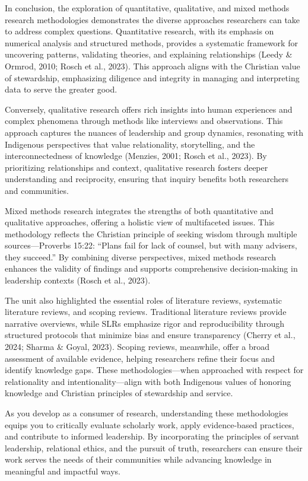 \documentclass[
  letterpaper,
  DIV=11,
  numbers=noendperiod]{scrreprt}
\begin{document}

In conclusion, the exploration of quantitative, qualitative, and mixed
methods research methodologies demonstrates the diverse approaches
researchers can take to address complex questions. Quantitative
research, with its emphasis on numerical analysis and structured
methods, provides a systematic framework for uncovering patterns,
validating theories, and explaining relationships (Leedy \& Ormrod,
2010; Rosch et al., 2023). This approach aligns with the Christian value
of stewardship, emphasizing diligence and integrity in managing and
interpreting data to serve the greater good.

Conversely, qualitative research offers rich insights into human
experiences and complex phenomena through methods like interviews and
observations. This approach captures the nuances of leadership and group
dynamics, resonating with Indigenous perspectives that value
relationality, storytelling, and the interconnectedness of knowledge
(Menzies, 2001; Rosch et al., 2023). By prioritizing relationships and
context, qualitative research fosters deeper understanding and
reciprocity, ensuring that inquiry benefits both researchers and
communities.

Mixed methods research integrates the strengths of both quantitative and
qualitative approaches, offering a holistic view of multifaceted issues.
This methodology reflects the Christian principle of seeking wisdom
through multiple sources---Proverbs 15:22: ``Plans fail for lack of
counsel, but with many advisers, they succeed.'' By combining diverse
perspectives, mixed methods research enhances the validity of findings
and supports comprehensive decision-making in leadership contexts (Rosch
et al., 2023).

The unit also highlighted the essential roles of literature reviews,
systematic literature reviews, and scoping reviews. Traditional
literature reviews provide narrative overviews, while SLRs emphasize
rigor and reproducibility through structured protocols that minimize
bias and ensure transparency (Cherry et al., 2024; Sharma \& Goyal,
2023). Scoping reviews, meanwhile, offer a broad assessment of available
evidence, helping researchers refine their focus and identify knowledge
gaps. These methodologies---when approached with respect for
relationality and intentionality---align with both Indigenous values of
honoring knowledge and Christian principles of stewardship and service.

As you develop as a consumer of research, understanding these
methodologies equips you to critically evaluate scholarly work, apply
evidence-based practices, and contribute to informed leadership. By
incorporating the principles of servant leadership, relational ethics,
and the pursuit of truth, researchers can ensure their work serves the
needs of their communities while advancing knowledge in meaningful and
impactful ways.
\end{document}

